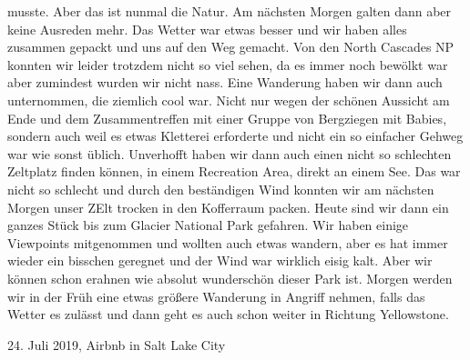 \documentclass[11pt]{book}
\begin{document}
musste. Aber das ist nunmal die Natur. 
Am nächsten Morgen galten dann aber keine Ausreden mehr. Das Wetter war etwas besser und wir haben alles zusammen gepackt und uns auf den Weg gemacht. Von 
den North Cascades NP konnten wir leider trotzdem nicht so viel sehen, da es immer noch bewölkt war aber zumindest wurden wir nicht nass. Eine Wanderung 
haben wir dann auch unternommen, die ziemlich cool war. Nicht nur wegen der schönen Aussicht am Ende und dem Zusammentreffen mit einer Gruppe von 
Bergziegen mit Babies, sondern auch weil es etwas Kletterei erforderte und nicht ein so einfacher Gehweg war wie sonst üblich. Unverhofft haben wir 
dann auch einen nicht so schlechten Zeltplatz finden können, in einem Recreation Area, direkt an einem See. Das war nicht so schlecht und durch den 
beständigen Wind konnten wir am nächsten Morgen unser ZElt trocken in den Kofferraum packen. Heute sind wir dann ein ganzes Stück bis zum Glacier 
National Park gefahren. Wir haben einige Viewpoints mitgenommen und wollten auch etwas wandern, aber es hat immer wieder ein bisschen geregnet und der Wind 
war wirklich eisig kalt. Aber wir können schon erahnen wie absolut wunderschön dieser Park ist. Morgen werden wir in der Früh eine etwas größere 
Wanderung in Angriff nehmen, falls das Wetter es zulässt und dann geht es auch schon weiter in Richtung Yellowstone.


24. Juli 2019, Airbnb in Salt Lake City
\end{document}
